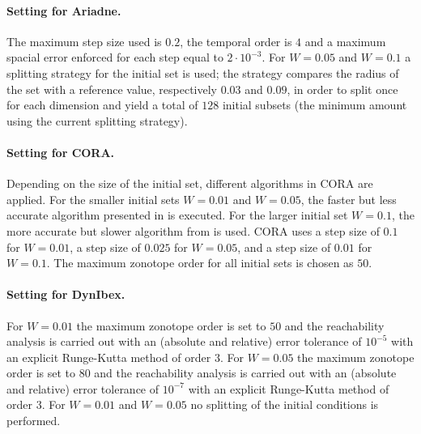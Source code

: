 \documentclass[EPiC]{easychair}
\begin{document}
\clearpage

\paragraph{Setting for Ariadne.}
The maximum step size used is $0.2$, the temporal order is $4$ and a maximum spacial error enforced for each step equal to $2 \cdot 10^{-3}$. For $W=0.05$ and $W=0.1$ a splitting strategy for the initial set is used; the strategy compares the radius of the set with a reference value, respectively $0.03$ and $0.09$, in order to split once for each dimension and yield a total of $128$ initial subsets (the minimum amount using the current splitting strategy).

\paragraph{Setting for CORA.}
Depending on the size of the initial set, different algorithms in CORA are applied. For the smaller initial sets $W = 0.01$ and $W = 0.05$, the faster but less accurate algorithm presented in \cite{Althoff2008c} is executed. For the larger initial set $W = 0.1$, the more accurate but slower algorithm from \cite{Althoff2013a} is used. CORA uses a step size of $0.1$ for $W = 0.01$, a step size of $0.025$ for $W = 0.05$, and a step size of $0.01$ for $W = 0.1$. The maximum zonotope order for all initial sets is chosen as $50$.


\paragraph{Setting for DynIbex.}
For $W=0.01$ the maximum zonotope order is set to $50$ and the reachability analysis is carried out with an (absolute and relative) error tolerance of $10^{-5}$ with an explicit Runge-Kutta method of order $3$. For $W=0.05$ the maximum zonotope order is set to $80$ and the reachability analysis is carried out with an (absolute and relative) error tolerance of $10^{-7}$ with an explicit Runge-Kutta method of order $3$. For $W=0.01$ and $W=0.05$ no splitting of the initial conditions is performed. %
\end{document}
